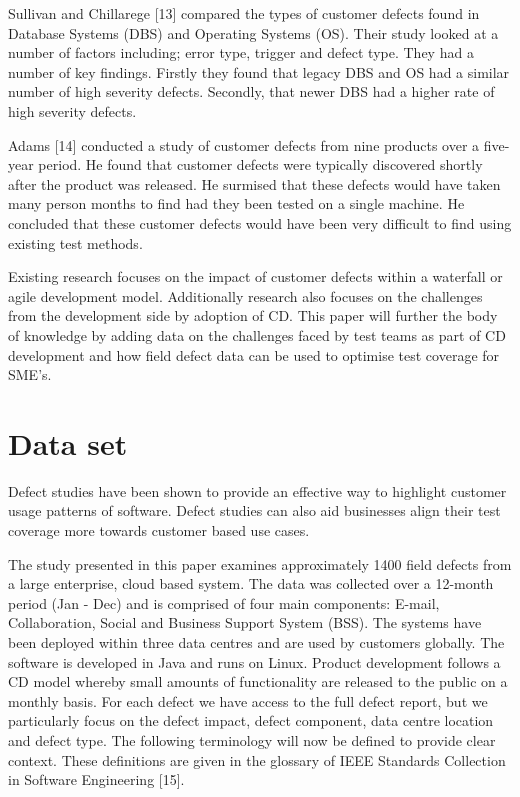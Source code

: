 \documentclass[conference]{IEEEtran}
\begin{document}
Sullivan and Chillarege [13] compared the types of customer defects found in Database Systems (DBS) and Operating Systems (OS). Their study looked at a number of factors including; error type, trigger and defect type. They had a number of key findings. Firstly they found that legacy DBS and OS had a similar number of high severity defects. Secondly, that newer DBS had a higher rate of high severity defects. \par
Adams [14] conducted a study of customer defects from nine products over a five-year period. He found that customer defects were typically discovered shortly after the product was released. He surmised that these defects would have taken many person months to find had they been tested on a single machine. He concluded that these customer defects would have been very difficult to find using existing test methods. \par
Existing research focuses on the impact of customer defects within a waterfall or agile development model. Additionally research also focuses on the challenges from the development side by adoption of CD. This paper will further the body of knowledge by adding data on the challenges faced by test teams as part of CD development and how field defect data can be used to optimise test coverage for SME's.

\section{Data set}

Defect studies have been shown to provide an effective way to highlight customer usage patterns of software. Defect studies can also aid businesses align their test coverage more towards customer based use cases. \par
The study presented in this paper examines approximately 1400 field defects from a large enterprise, cloud based system. The data was collected over a 12-month period (Jan - Dec) and is comprised of four main components: E-mail, Collaboration, Social and Business Support System (BSS). The systems have been deployed within three data centres and are used by customers globally. The software is developed in Java and runs on Linux. Product development follows a CD model whereby small amounts of functionality are released to the public on a monthly basis.  For each defect we have access to the full defect report, but we particularly focus on the defect impact, defect component, data centre location and defect type. 
The following terminology will now be defined to provide clear context. These definitions are given in the glossary of IEEE Standards Collection in Software Engineering [15]. 
\end{document}
